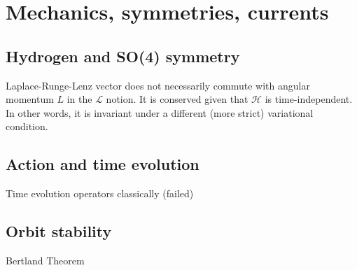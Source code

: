 
\section{\label{sec:Mec}Mechanics, symmetries, currents}

\subsection{\label{sec:SO4}Hydrogen and SO(4) symmetry}

	Laplace-Runge-Lenz vector does not necessarily commute with angular momentum $L$ in the $\mathcal{L}$ notion. It is conserved given that $\mathcal{H}$ is time-independent. In other words, it is invariant under a different (more strict) variational condition.

\subsection{\label{sec:Action}Action and time evolution}

	Time evolution operators classically (failed)

\subsection{\label{sec:Bertland}Orbit stability}

	Bertland Theorem
